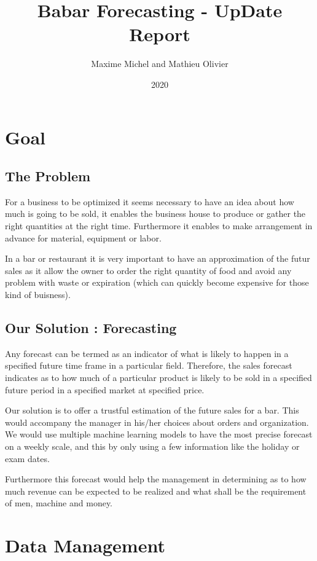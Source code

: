 \documentclass{report}
\title{Babar Forecasting - UpDate Report}
\author{Maxime Michel and Mathieu Olivier}
\date{2020}
\begin{document}
 
\maketitle

\chapter{Goal}

\section{The Problem}

For a business to be optimized it seems necessary to have an idea about how much is going to be sold, it enables the business house to produce or gather the right quantities at the right time. Furthermore it enables to make arrangement in advance for material, equipment or labor.

In a bar or restaurant it is very important to have an approximation of the futur sales as it allow the owner to order the right quantity of food and avoid any problem with waste or expiration (which can quickly become expensive for those kind of buisness). 

\section{Our Solution : Forecasting}

Any forecast can be termed as an indicator of what is likely to happen in a specified future time frame in a particular field. Therefore, the sales forecast indicates as to how much of a particular product is likely to be sold in a specified future period in a specified market at specified price.

Our solution is to offer a trustful estimation of the future sales for a bar. This would accompany the manager in his/her choices about orders and organization. We would use multiple machine learning models to have the most precise forecast on a weekly scale, and this by only using a few information like the holiday or exam dates.

Furthermore this forecast would help the management in determining as to how much revenue can be expected to be realized and what shall be the requirement of men, machine and money.


\chapter{Data Management}
\end{document}
